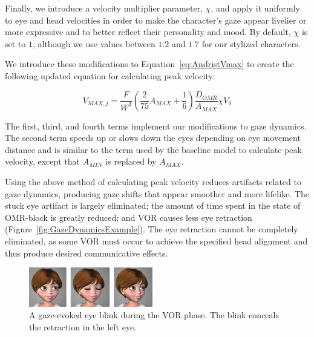 Finally, we introduce a velocity multiplier parameter, $\chi$, and apply it uniformly to eye and head velocities in order to make the character's gaze appear livelier or more expressive and to better reflect their personality and mood. By default, $\chi$ is set to $1$, although we use values between $1.2$ and $1.7$ for our stylized characters.

We introduce these modifications to Equation~\ref{eq:AndristVmax} to create the following updated equation for calculating peak velocity:

\begin{equation}
V_{MAX,j} = \frac{F}{W^3}( \frac{2}{75} A_{MAX} + \frac{1}{6} ) \frac{D_{OMR}}{A_{MAX}} \chi V_0 %
\end{equation}

The first, third, and fourth terms implement our modifications to gaze dynamics. The second term speeds up or slows down the eyes depending on eye movement distance and is similar to the term used by the baseline model to calculate peak velocity, except that $A_{MIN}$ is replaced by $A_{MAX}$.


Using the above method of calculating peak velocity reduces artifacts related to gaze dynamics, producing gaze shifts that appear smoother and more lifelike. The stuck eye artifact is largely eliminated; the amount of time spent in the state of OMR-block is greatly reduced; and VOR causes less eye retraction (Figure~\ref{fig:GazeDynamicsExample}). The eye retraction cannot be completely eliminated, as some VOR must occur to achieve the specified head alignment and thus produce desired communicative effects.

\begin{figure}[!b]
\centering
\vspace{-2pt}
\includegraphics[width=0.48\textwidth]{Figures/GazeEvokedBlinkVOR-small.pdf}
\caption{A gaze-evoked eye blink during the VOR phase. The blink conceals the retraction in the left eye.}
\vspace{-6pt}
\label{fig:GazeEvokedBlinkVOR}
\end{figure}

